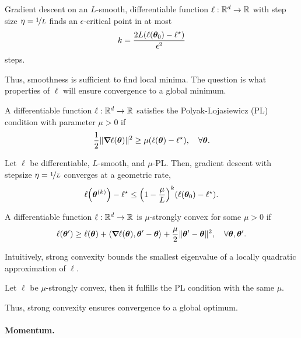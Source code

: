 \begin{lemma}
    Gradient descent on an $L$-smooth, differentiable function $\ell: \mathbb{R}^d \to \mathbb{R}$ with step size $\eta = \nicefrac{1}{L}$ finds an $\epsilon$-critical point in at most \[
        k = \frac{2L\lft(\ell\lft(\vec{\theta}_0\rgt) - \ell^\star\rgt)}{\epsilon^2}
    \]
    steps.
\end{lemma}

Thus, smoothness is sufficient to find local minima. The question is what properties of $\ell$ will
ensure convergence to a global minimum.

\begin{definition}
    A differentiable function $\ell: \mathbb{R}^d \to \mathbb{R}$ satisfies the Polyak-Lojasiewicz (PL) condition with parameter $\mu > 0$ if \[
        \frac{1}{2} \| \bm{\nabla}_{\! } \ell(\bm{\theta}) \|^2 \geq \mu (\ell(\bm{\theta}) - \ell^\star), \quad \forall \bm{\theta}.
    \]
\end{definition}

\begin{lemma}
    Let $\ell$ be differentiable, $L$-smooth, and $\mu$-PL. Then, gradient descent with stepsize $\eta = \nicefrac{1}{L}$ converges at a geometric rate, \[
        \ell\lft( \vec{\theta}^{(k)} \rgt) - \ell^\star \leq \lft( 1 - \frac{\mu}{L} \rgt)^k \lft( \ell(\vec{\theta}_0) - \ell^\star \rgt).
    \]
\end{lemma}

\begin{definition}
    A differentiable function $\ell: \mathbb{R}^d \to \mathbb{R}$ is $\mu$-strongly convex for some $\mu > 0$ if \[
        \ell(\bm{\theta}') \geq \ell(\bm{\theta}) + \langle \bm{\nabla}_{\! } \ell(\bm{\theta}), \bm{\theta}' - \bm{\theta} \rangle + \frac{\mu}{2} \| \bm{\theta}' - \bm{\theta} \|^2, \quad \forall \bm{\theta}, \bm{\theta}'.
    \]
\end{definition}

Intuitively, strong convexity bounds the smallest eigenvalue of a locally quadratic approximation
of $\ell$.

\begin{lemma}
    Let $\ell$ be $\mu$-strongly convex, then it fulfills the PL condition with the same $\mu$.
\end{lemma}

Thus, strong convexity ensures convergence to a global optimum.

\paragraph{Momentum.}

